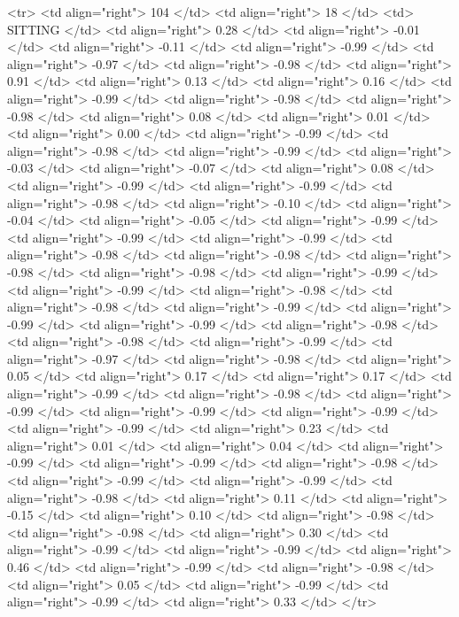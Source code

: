   <tr> <td align="right"> 104 </td> <td align="right">  18 </td> <td> SITTING </td> <td align="right"> 0.28 </td> <td align="right"> -0.01 </td> <td align="right"> -0.11 </td> <td align="right"> -0.99 </td> <td align="right"> -0.97 </td> <td align="right"> -0.98 </td> <td align="right"> 0.91 </td> <td align="right"> 0.13 </td> <td align="right"> 0.16 </td> <td align="right"> -0.99 </td> <td align="right"> -0.98 </td> <td align="right"> -0.98 </td> <td align="right"> 0.08 </td> <td align="right"> 0.01 </td> <td align="right"> 0.00 </td> <td align="right"> -0.99 </td> <td align="right"> -0.98 </td> <td align="right"> -0.99 </td> <td align="right"> -0.03 </td> <td align="right"> -0.07 </td> <td align="right"> 0.08 </td> <td align="right"> -0.99 </td> <td align="right"> -0.99 </td> <td align="right"> -0.98 </td> <td align="right"> -0.10 </td> <td align="right"> -0.04 </td> <td align="right"> -0.05 </td> <td align="right"> -0.99 </td> <td align="right"> -0.99 </td> <td align="right"> -0.99 </td> <td align="right"> -0.98 </td> <td align="right"> -0.98 </td> <td align="right"> -0.98 </td> <td align="right"> -0.98 </td> <td align="right"> -0.99 </td> <td align="right"> -0.99 </td> <td align="right"> -0.98 </td> <td align="right"> -0.98 </td> <td align="right"> -0.99 </td> <td align="right"> -0.99 </td> <td align="right"> -0.99 </td> <td align="right"> -0.98 </td> <td align="right"> -0.98 </td> <td align="right"> -0.99 </td> <td align="right"> -0.97 </td> <td align="right"> -0.98 </td> <td align="right"> 0.05 </td> <td align="right"> 0.17 </td> <td align="right"> 0.17 </td> <td align="right"> -0.99 </td> <td align="right"> -0.98 </td> <td align="right"> -0.99 </td> <td align="right"> -0.99 </td> <td align="right"> -0.99 </td> <td align="right"> -0.99 </td> <td align="right"> 0.23 </td> <td align="right"> 0.01 </td> <td align="right"> 0.04 </td> <td align="right"> -0.99 </td> <td align="right"> -0.99 </td> <td align="right"> -0.98 </td> <td align="right"> -0.99 </td> <td align="right"> -0.99 </td> <td align="right"> -0.98 </td> <td align="right"> 0.11 </td> <td align="right"> -0.15 </td> <td align="right"> 0.10 </td> <td align="right"> -0.98 </td> <td align="right"> -0.98 </td> <td align="right"> 0.30 </td> <td align="right"> -0.99 </td> <td align="right"> -0.99 </td> <td align="right"> 0.46 </td> <td align="right"> -0.99 </td> <td align="right"> -0.98 </td> <td align="right"> 0.05 </td> <td align="right"> -0.99 </td> <td align="right"> -0.99 </td> <td align="right"> 0.33 </td> </tr>
